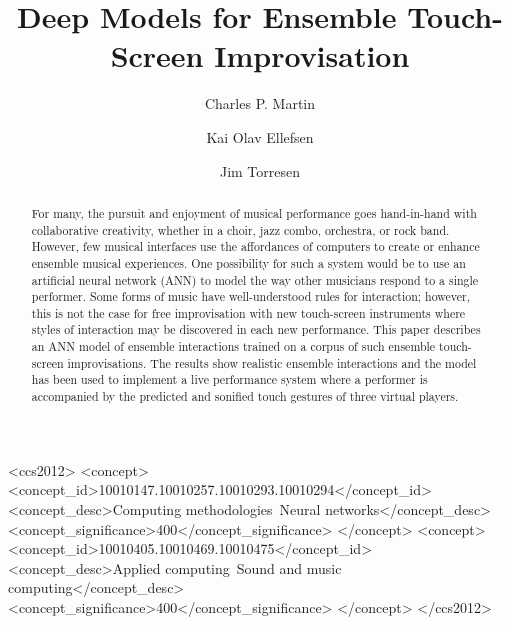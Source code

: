 \documentclass[sigchi, authorversion=true]{acmart}
\begin{document}

\title{Deep Models for Ensemble Touch-Screen Improvisation}

\author{Charles P. Martin}

\author{Kai Olav Ellefsen}

\author{Jim Torresen}

\begin{abstract}
  For many, the pursuit and enjoyment of musical performance goes hand-in-hand with collaborative creativity, whether in a choir, jazz combo, orchestra, or rock band. However, few musical interfaces use the affordances of computers to create or enhance ensemble musical experiences. One possibility for such a system would be to use an artificial neural network (ANN) to model the way other musicians respond to a single performer. Some forms of music have well-understood rules for interaction; however, this is not the case for free improvisation with new touch-screen instruments where styles of interaction may be discovered in each new performance. This paper describes an ANN model of ensemble interactions trained on a corpus of such ensemble touch-screen improvisations. The results show realistic ensemble interactions and the model has been used to implement a live performance system where a performer is accompanied by the predicted and sonified touch gestures of three virtual players.
\end{abstract}

\begin{CCSXML}
<ccs2012>
<concept>
<concept_id>10010147.10010257.10010293.10010294</concept_id>
<concept_desc>Computing methodologies~Neural networks</concept_desc>
<concept_significance>400</concept_significance>
</concept>
<concept>
<concept_id>10010405.10010469.10010475</concept_id>
<concept_desc>Applied computing~Sound and music computing</concept_desc>
<concept_significance>400</concept_significance>
</concept>
</ccs2012>
\end{CCSXML}
\end{document}
